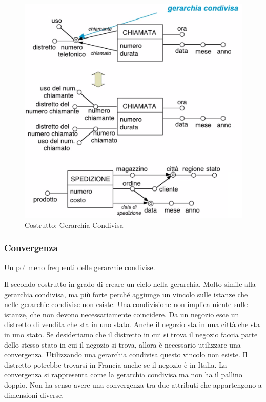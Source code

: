 \begin{figure}[H]
	\begin{center}
		\includegraphics[width=0.7\linewidth]{img/gercond.png}
		\caption{Costrutto: Gerarchia Condivisa}
	\end{center}
\end{figure}

\subsubsection{Convergenza}
\begin{info}
	Un po' meno frequenti delle gerarchie condivise.
\end{info}
Il secondo costrutto in grado di creare un ciclo nella gerarchia. Molto simile alla gerarchia condivisa, ma più forte perché aggiunge un vincolo sulle istanze che nelle gerarchie condivise non esiste.
Una condivisione non implica niente sulle istanze, che non devono necessariamente coincidere.\newline
Da un negozio esce un distretto di vendita che sta in uno stato. Anche il negozio sta in una città che sta in uno stato. Se desideriamo che il distretto in cui si trova il negozio faccia parte dello stesso stato in cui il negozio si trova, allora è necessario utilizzare una convergenza.\newline
Utilizzando una gerarchia condivisa questo vincolo non esiste. Il distretto potrebbe trovarsi in Francia anche se il negozio è in Italia. La convergenza si rappresenta come la gerarchia condivisa ma non ha il pallino doppio.\newline
Non ha senso avere una convergenza tra due attributi che appartengono a dimensioni diverse.

